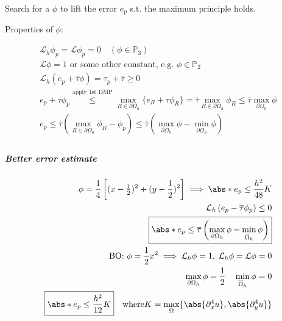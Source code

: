 Search for a \(\phi\) to lift the error \(e_p\) s.t. the maximum principle holds.

Properties of \(\phi\):

\begin{align*}
  \mathcal{L}_h \phi_p = \mathcal{L} \phi_p = 0 \quad (\phi \in \mathbb{P}_3)                                                                                                                                     \\
  \mathcal{L} \phi = 1 \text{ or some other constant, e.g. } \phi \in \mathbb{P}_2                                                                                                                                \\
  \mathcal{L}_h(e_p + \overline{\tau}\phi) = \tau_p + \overline{\tau} \geq 0                                                                                                                                      \\
  e_p + \tau \phi_p \overset{\text{apply 1st DMP}}{\leq} \max_{R \in \partial\Omega_h}\{e_R + \tau \phi_R\} = \overline{\tau}\max_{R \in \partial\Omega_h}\phi_R \leq \overline{\tau} \max_{\partial\Omega_h}\phi \\
  e_p \leq \overline{\tau}\left(\max_{R \in \partial\Omega_h}\phi_R - \phi_p\right) \leq \overline{\tau}\left(\max_{\partial\Omega_h}\phi - \min_{\partial\Omega_h}\phi\right)                                    \\
\end{align*}

\subparagraph{Better error estimate}
\begin{align*}
  \phi = \frac{1}{4}\left[(x - \tfrac{1}{2})^2 + (y - \frac{1}{2})^2\right] \implies \abs*{e_p} \leq \frac{h^2}{48}K \\
  \mathcal{L}_h \left(e_p - \overline{\tau}\phi_p\right)\leq 0                                                       \\
  \boxed{\abs*{e_p} \leq \overline{\tau}\left(\max_{\partial\Omega_h}\phi - \min_{\overline{\Omega}_h}\phi\right)}   \\
  \text{BO: } \phi = \frac{1}{2}x^2 \implies \mathcal{L}_h \phi = 1, \; \mathcal{L}_h \phi = \mathcal{L} \phi = 0    \\
  \max_{\partial\Omega_h}\phi = \frac{1}{2} \quad \min_{\overline{\Omega}_h}\phi = 0                                 \\
  \boxed{\abs*{e_p} \leq \frac{h^2}{12}K} \quad \text{where} K = \max_{\Omega} \{\abs{\partial_x^4 u}, \abs{\partial_y^4 u}\}
\end{align*}


